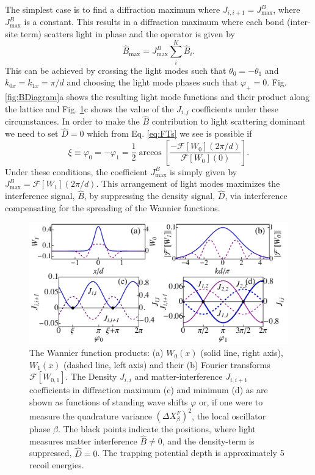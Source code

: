 The simplest case is to find a diffraction maximum where
$J_{i,i+1} = J^B_\mathrm{max}$, where $J^B_\mathrm{max}$ is a
constant. This results in a diffraction maximum where each bond
(inter-site term) scatters light in phase and the operator is given by
\begin{equation}
  \hat{B}_\mathrm{max} = J^B_\mathrm{max} \sum_i^K \hat{B}_i .
\end{equation}
This can be achieved by crossing the light modes such that
$\theta_0 = -\theta_1$ and $k_{0x} = k_{1x} = \pi/d$ and choosing the
light mode phases such that $\varphi_+ = 0$. Fig. \ref{fig:BDiagram}a
shows the resulting light mode functions and their product along the
lattice and Fig. \ref{fig:WannierProducts}c shows the value of the
$J_{i,j}$ coefficients under these circumstances. In order to make the
$\hat{B}$ contribution to light scattering dominant we need to set
$\hat{D} = 0$ which from Eq. \eqref{eq:FTs} we see is possible if
\begin{equation}
  \xi \equiv \varphi_0 = -\varphi_1 =
  \frac{1}{2}\arccos\left[\frac{-\mathcal{F}[W_0](2\pi/d)}{\mathcal{F}[W_0](0)}\right].
\end{equation}
Under these conditions, the coefficient $J^B_\mathrm{max}$ is simply
given by $J^B_\mathrm{max} = \mathcal{F}[W_1](2 \pi / d)$. This
arrangement of light modes maximizes the interference signal,
$\hat{B}$, by suppressing the density signal, $\hat{D}$, via
interference compensating for the spreading of the Wannier functions.

\begin{figure}
  \centering
  \includegraphics[width=\linewidth]{WF_S}
  \caption[Wannier Function Products]{The Wannier function products:
    (a) $W_0(x)$ (solid line, right axis), $W_1(x)$ (dashed line, left
    axis) and their (b) Fourier transforms $\mathcal{F}[W_{0,1}]$. The
    Density $J_{i,i}$ and matter-interference $J_{i,i+1}$ coefficients
    in diffraction maximum (c) and minimum (d) as are shown as
    functions of standing wave shifts $\varphi$ or, if one were to
    measure the quadrature variance $(\Delta X^F_\beta)^2$, the local
    oscillator phase $\beta$. The black points indicate the positions,
    where light measures matter interference $\hat{B} \ne 0$, and the
    density-term is suppressed, $\hat{D} = 0$. The trapping potential
    depth is approximately 5 recoil energies.}
  \label{fig:WannierProducts}
\end{figure}

